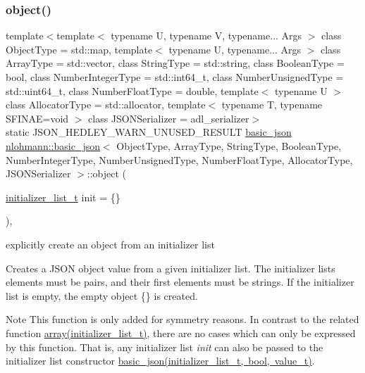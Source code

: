 \subsubsection{\texorpdfstring{object()}{object()}}
{\footnotesize\ttfamily template$<$template$<$ typename U, typename V, typename... Args $>$ class Object\+Type = std\+::map, template$<$ typename U, typename... Args $>$ class Array\+Type = std\+::vector, class String\+Type  = std\+::string, class Boolean\+Type  = bool, class Number\+Integer\+Type  = std\+::int64\+\_\+t, class Number\+Unsigned\+Type  = std\+::uint64\+\_\+t, class Number\+Float\+Type  = double, template$<$ typename U $>$ class Allocator\+Type = std\+::allocator, template$<$ typename T, typename S\+F\+I\+N\+A\+E=void $>$ class J\+S\+O\+N\+Serializer = adl\+\_\+serializer$>$ \\
static J\+S\+O\+N\+\_\+\+H\+E\+D\+L\+E\+Y\+\_\+\+W\+A\+R\+N\+\_\+\+U\+N\+U\+S\+E\+D\+\_\+\+R\+E\+S\+U\+LT \mbox{\hyperlink{classnlohmann_1_1basic__json}{basic\+\_\+json}} \mbox{\hyperlink{classnlohmann_1_1basic__json}{nlohmann\+::basic\+\_\+json}}$<$ Object\+Type, Array\+Type, String\+Type, Boolean\+Type, Number\+Integer\+Type, Number\+Unsigned\+Type, Number\+Float\+Type, Allocator\+Type, J\+S\+O\+N\+Serializer $>$\+::object (\begin{DoxyParamCaption}\item[{\mbox{\hyperlink{classnlohmann_1_1basic__json_ad70a098fbc01c53497db29d3b5b656a9}{initializer\+\_\+list\+\_\+t}}}]{init = {\ttfamily \{\}} }\end{DoxyParamCaption})\hspace{0.3cm}{\ttfamily [inline]}, {\ttfamily [static]}}



explicitly create an object from an initializer list 

Creates a J\+S\+ON object value from a given initializer list. The initializer lists elements must be pairs, and their first elements must be strings. If the initializer list is empty, the empty object {\ttfamily \{\}} is created.

\begin{DoxyNote}{Note}
This function is only added for symmetry reasons. In contrast to the related function \mbox{\hyperlink{classnlohmann_1_1basic__json_a8a7d537fc297bbc5b845f92fe0445e3b}{array(initializer\+\_\+list\+\_\+t)}}, there are no cases which can only be expressed by this function. That is, any initializer list {\itshape init} can also be passed to the initializer list constructor \mbox{\hyperlink{classnlohmann_1_1basic__json_ab5dfd9a2b2663b219641cb7fe59b6da2}{basic\+\_\+json(initializer\+\_\+list\+\_\+t, bool, value\+\_\+t)}}.
\end{DoxyNote}


